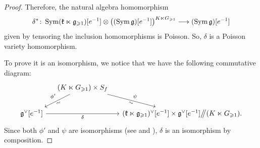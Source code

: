 \begin{proof}
	Therefore, the natural algebra homomorphism
	\[ \delta^* \colon \operatorname{Sym}(\mathfrak k \ltimes \mathfrak g_{\geqslant 1})[e^{-1}] \otimes \big((\operatorname{Sym} \mathfrak g)[e^{-1}]\big)^{K \ltimes G_{\geqslant 1}} \longrightarrow (\operatorname{Sym} \mathfrak g)[e^{-1}] \]
	given by tensoring the inclusion homomorphisms is Poisson. So, $\delta$ is a Poisson variety homomorphism. 
	
	To prove it is an isomorphism, we notice that we have the following commutative diagram:
	\[ \begin{tikzcd}[column sep = small]
		& (K \ltimes G_{\geqslant 1}) \times S_f \arrow[ld, "\phi'"', "\sim"'{sloped}] \arrow[rd, "\psi", "\sim"'{sloped}] & \\
		\g^\vee[e^{-1}] \arrow[rr, "\delta"'] & & (\kfk \ltimes \g_{\geqslant 1})^\vee[e^{-1}] \times \g^\vee[e^{-1}] \git (K \ltimes G_{\geqslant 1}).
	\end{tikzcd} \]
	Since both $\phi'$ and $\psi$ are isomorphisms (see  and ), $\delta$ is an isomorphism by composition.
\end{proof}